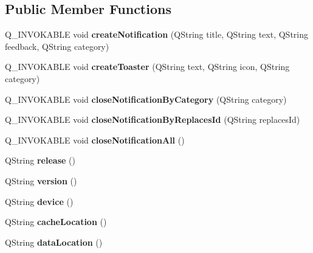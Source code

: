 \subsection*{Public Member Functions}
\begin{DoxyCompactItemize}
\item 
\mbox{\label{classOS_ac21113cbcd347809f657c6a27a0278f6}} 
Q\+\_\+\+I\+N\+V\+O\+K\+A\+B\+LE void {\bfseries create\+Notification} (Q\+String title, Q\+String text, Q\+String feedback, Q\+String category)
\item 
\mbox{\label{classOS_a949a6aa1c2f8cd63d27cd6b8869da8fc}} 
Q\+\_\+\+I\+N\+V\+O\+K\+A\+B\+LE void {\bfseries create\+Toaster} (Q\+String text, Q\+String icon, Q\+String category)
\item 
\mbox{\label{classOS_a8ab936784f48408f14ad73f10ae5afb8}} 
Q\+\_\+\+I\+N\+V\+O\+K\+A\+B\+LE void {\bfseries close\+Notification\+By\+Category} (Q\+String category)
\item 
\mbox{\label{classOS_a8cc3c6824e01ae679819c8c3daf7842e}} 
Q\+\_\+\+I\+N\+V\+O\+K\+A\+B\+LE void {\bfseries close\+Notification\+By\+Replaces\+Id} (Q\+String replaces\+Id)
\item 
\mbox{\label{classOS_a16c6da56d519e2c2bccbdeaf5c4ff29b}} 
Q\+\_\+\+I\+N\+V\+O\+K\+A\+B\+LE void {\bfseries close\+Notification\+All} ()
\item 
\mbox{\label{classOS_a1d00cd418f5d83cc174492326f7cd604}} 
Q\+String {\bfseries release} ()
\item 
\mbox{\label{classOS_a4cd043becb244d8f40bdcc55c0417a71}} 
Q\+String {\bfseries version} ()
\item 
\mbox{\label{classOS_a800e819bbb7aa20945893d138b2a1bb3}} 
Q\+String {\bfseries device} ()
\item 
\mbox{\label{classOS_a44dcb6a2ee199b111d98eb1e364bfef7}} 
Q\+String {\bfseries cache\+Location} ()
\item 
\mbox{\label{classOS_ae8a69330410d1b615443920baa19cea7}} 
Q\+String {\bfseries data\+Location} ()

\end{DoxyCompactItemize}
